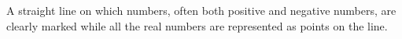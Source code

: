 A straight line on which numbers, often both positive and negative numbers, 
are clearly marked while all the real numbers are represented as points on the 
line.